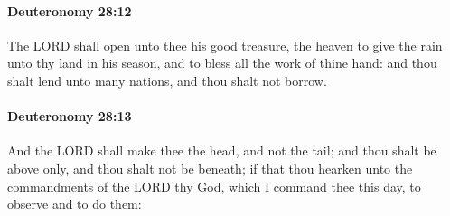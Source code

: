 		\paragraph{Deuteronomy 28:12} %
			\label{DEUTERONOMY-28-12}

			The LORD shall open unto thee his good treasure, the heaven to give the rain unto thy land in his season, and to bless all the work of thine hand: and thou shalt lend unto many nations, and thou shalt not borrow.


		\paragraph{Deuteronomy 28:13} %
			\label{DEUTERONOMY-28-13}

			And the LORD shall make thee the head, and not the tail; and thou shalt be above only, and thou shalt not be beneath; if that thou hearken unto the commandments of the LORD thy God, which I command thee this day, to observe and to do them:

